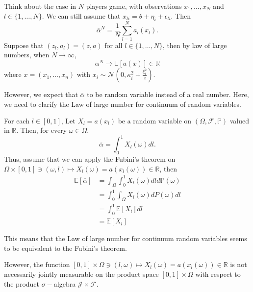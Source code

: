 \begin{remark}
	Think about the case in $N$ players game, with observations $x_1, \ldots, x_N$ and $l\in \{1,\ldots,N\}$. We can still assume that $x_{li} = \theta + \eta_i + \epsilon_{li}$. Then 
	$$
		\overline{\alpha}^N = \frac{1}{N} \sum_{l=1}^N a_l(x_l).
	$$
	Suppose that $(z_l, a_l) = (z,a)$ for all $l\in \{1,\ldots,N\}$, then by law of large numbers, when $N \to \infty$, 
	$$ \overline{\alpha}^N \longrightarrow \mathbb{E}[a(x)] \in \mathbb{R}$$
	where $x=(x_1, \ldots, x_n)$ with $x_i \sim \mathcal{N}(0, \kappa_i^2 + \frac{\xi_i^2}{z})$.
	
	However, we expect that $\overline{\alpha}$ to be random variable instead of a real number. Here, we need to clarify the Law of large number for continuum of random variables.
	
	For each $l\in [0,1]$, Let $X_l = a(x_l)$ be a random variable on $(\Omega, \mathcal{F}, \mathbb{P})$ valued in $\mathbb{R}$. Then, for every $\omega \in \Omega$,
	$$
		\overline{\alpha} = \int_0^1 X_l(\omega) dl.
	$$
	Thus, assume that we can apply the Fubini's theorem on $\Omega \times [0,1] \ni (\omega, l) \mapsto X_l(\omega) = a(x_l(\omega)) \in \mathbb{R}$, then
	\begin{align*}
		\mathbb{E}[\overline{\alpha}] &= \int_\Omega \int_0^1 X_l(\omega) dl d\mathbb{P}(\omega) \\
		&=\int_0^1 \int_{\Omega} X_l(\omega) dP(\omega) dl \\
		&= \int_0^1 \mathbb{E}[X_l] dl \\
		&= \mathbb{E}[X_l]
	\end{align*}
	
	This means that the Law of large number for continuum random variables seems to be equivalent to the Fubini's theorem. 
	
	However, the function $ [0,1] \times \Omega \ni (l, \omega) \mapsto X_l(\omega) = a(x_l(\omega)) \in \mathbb{R}$ is not necessarily jointly measurable on the product space $[0,1] \times \Omega$ with respect to the product $\sigma-$algebra $ \mathcal{J} \times \mathcal{F}$.
\end{remark}

